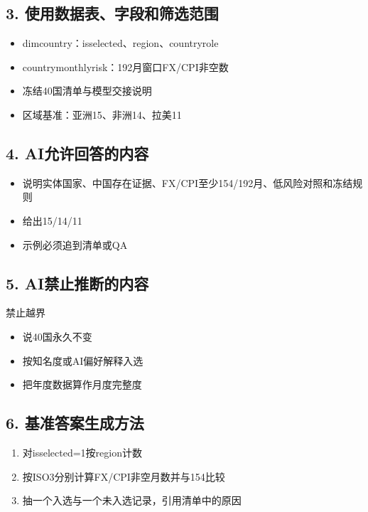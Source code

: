 \documentclass[UTF8,openany,zihao=-4]{ctexbook}
\renewcommand{\_}{\textunderscore\allowbreak}
\begin{document}
\subsection*{3. 使用数据表、字段和筛选范围}
\begin{itemize}
\item dim\_country：is\_selected\_40、region、country\_role
\item country\_monthly\_risk：192月窗口FX/CPI非空数
\item 冻结40国清单与模型交接说明
\item 区域基准：亚洲15、非洲14、拉美11
\end{itemize}

\subsection*{4. AI允许回答的内容}
\begin{itemize}
\item 说明实体国家、中国存在证据、FX/CPI至少154/192月、低风险对照和冻结规则
\item 给出15/14/11
\item 示例必须追到清单或QA
\end{itemize}

\subsection*{5. AI禁止推断的内容}
\begin{dangerbox}{禁止越界}
\begin{itemize}
\item 说40国永久不变
\item 按知名度或AI偏好解释入选
\item 把年度数据算作月度完整度
\end{itemize}
\end{dangerbox}

\subsection*{6. 基准答案生成方法}
\begin{enumerate}
\item 对is\_selected\_40=1按region计数
\item 按ISO3分别计算FX/CPI非空月数并与154比较
\item 抽一个入选与一个未入选记录，引用清单中的原因
\end{enumerate}
\end{document}

